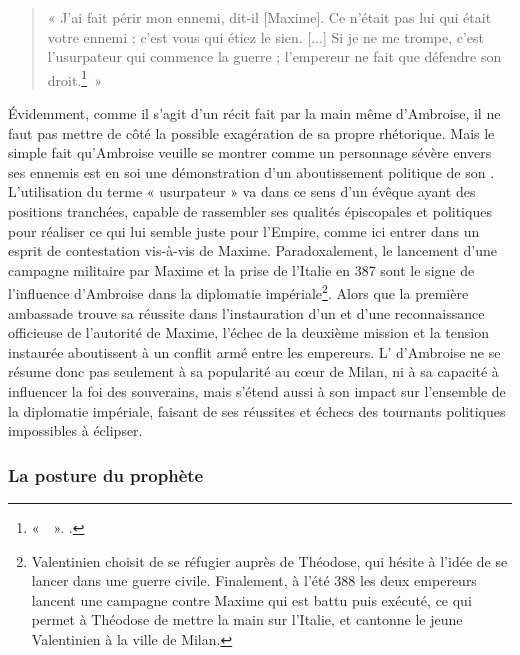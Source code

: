 \begin{quote} « J'ai fait périr mon ennemi, dit-il [Maxime]. Ce n'était pas lui qui était votre ennemi ; c'est vous qui étiez le sien. [...] Si je ne me trompe, c'est l'usurpateur qui commence la guerre ; l'empereur ne fait que défendre son droit.\footnote{«~~». \cite[, 10]{ambroise_lettres}.}~» \end{quote}

\bigskip

Évidemment, comme il s'agit d'un récit fait par la main même d'Ambroise, il ne faut pas mettre de côté la possible exagération de sa propre rhétorique. Mais le simple fait qu'Ambroise veuille se montrer comme un personnage sévère envers ses ennemis est en soi une démonstration d'un aboutissement politique de son . L'utilisation du terme « usurpateur » va dans ce sens d'un évêque ayant des positions tranchées, capable de rassembler ses qualités épiscopales et politiques pour réaliser ce qui lui semble juste pour l'Empire, comme ici entrer dans un esprit de contestation vis-à-vis de Maxime. Paradoxalement, le lancement d'une campagne militaire par Maxime et la prise de l'Italie en 387 sont le signe de l'influence d'Ambroise dans la diplomatie impériale\footnote{Valentinien choisit de se réfugier auprès de Théodose, qui hésite à l'idée de se lancer dans une guerre civile. Finalement, à l'été 388 les deux empereurs lancent une campagne contre Maxime qui est battu puis exécuté, ce qui permet à Théodose de mettre la main sur l'Italie, et cantonne le jeune Valentinien à la ville de Milan.}. Alors que la première ambassade trouve sa réussite dans l'instauration d'un  et d'une reconnaissance officieuse de l'autorité de Maxime, l'échec de la deuxième mission et la tension instaurée aboutissent à un conflit armé entre les empereurs. L' d'Ambroise ne se résume donc pas seulement à sa popularité au cœur de Milan, ni à sa capacité à influencer la foi des souverains, mais s'étend aussi à son impact sur l'ensemble de la diplomatie impériale, faisant de ses réussites et échecs des tournants politiques impossibles à éclipser.

\bigskip

\subsubsection{La posture du prophète}

